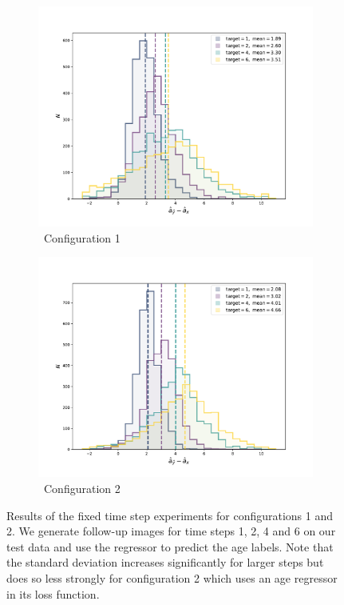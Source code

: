 \begin{figure}[h]
	\centering
	\begin{subfigure}{0.9\textwidth}
		\includegraphics[width=\linewidth, trim={0 20 0 20}, clip]{images/age_plots/hist_fixed_config1} 
		\caption{\ Configuration 1}
	\end{subfigure}
	\begin{subfigure}{0.9\textwidth}
		\includegraphics[width=\linewidth, trim={0 20 0 20}, clip]{images/age_plots/hist_fixed_config2}
		\caption{\ Configuration 2}
	\end{subfigure}
	 
	\caption{Results of the fixed time step experiments for configurations 1 and 2. We generate follow-up images for time steps 1, 2, 4 and 6 on our test data and use the regressor to predict the age labels. Note that the standard deviation increases significantly for larger steps but does so less strongly for configuration 2 which uses an age regressor in its loss function.}
	\label{fig:expfixedhist}
\end{figure}

